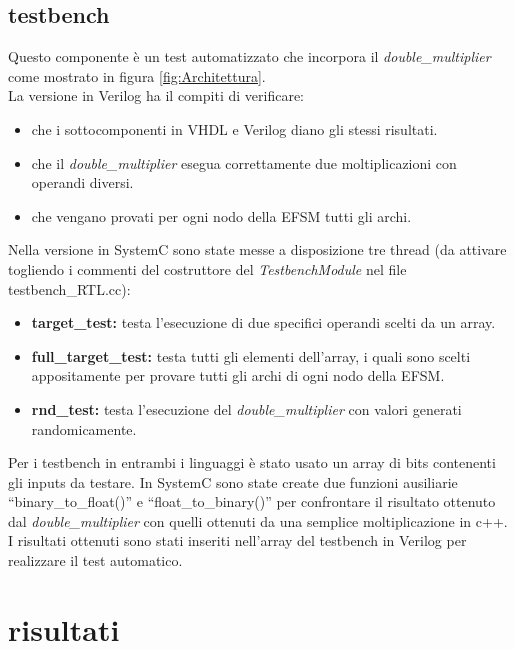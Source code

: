 \documentclass[]{IEEEtran}
\begin{document}
\subsection{testbench}
Questo componente è un test automatizzato che incorpora il \textit{double\_multiplier} come mostrato in figura \ref{fig:Architettura}.
\\La versione in Verilog ha il compiti di verificare:
\begin{itemize}
    \item che i sottocomponenti in VHDL e Verilog diano gli stessi risultati.
    \item che il \textit{double\_multiplier} esegua correttamente due moltiplicazioni con operandi diversi.
    \item che vengano provati per ogni nodo della EFSM tutti gli archi.
\end{itemize}
Nella versione in SystemC sono state messe a disposizione tre thread (da attivare togliendo i commenti del costruttore del \textit{TestbenchModule} nel file testbench\_RTL.cc):
\begin{itemize}
    \item \textbf{target\_test:} testa l'esecuzione di due specifici operandi scelti da un array.
    \item \textbf{full\_target\_test:} testa tutti gli elementi dell'array, i quali sono scelti appositamente per provare tutti gli archi di ogni nodo della EFSM.
    \item \textbf{rnd\_test:} testa l'esecuzione del \textit{double\_multiplier} con valori generati randomicamente.
\end{itemize}
Per i testbench in entrambi i linguaggi è stato usato un array di bits contenenti gli inputs da testare. In SystemC sono state create due funzioni ausiliarie ``binary\_to\_float()'' e ``float\_to\_binary()'' per confrontare il risultato ottenuto dal \textit{double\_multiplier} con quelli ottenuti da una semplice moltiplicazione in c++. I risultati ottenuti sono stati inseriti nell'array del testbench in Verilog per realizzare il test automatico.



\section{risultati}
\end{document}
